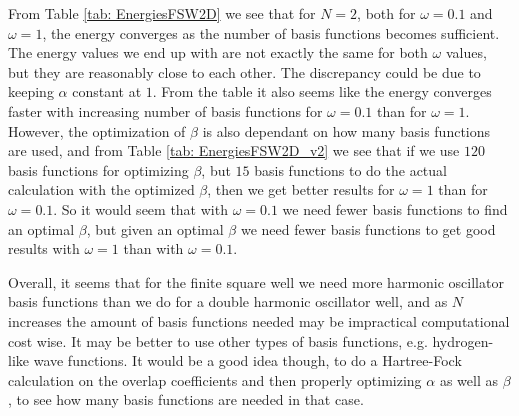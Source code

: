 \documentclass[../main.tex]{subfiles}
\begin{document}
From Table \ref{tab: EnergiesFSW2D} we see that for $N=2$, both for $\omega = 0.1$ and $\omega = 1$, the energy converges as the number of basis functions becomes sufficient. The energy values we end up with are not exactly the same for both $\omega$ values, but they are reasonably close to each other. The discrepancy could be due to keeping $\alpha$ constant at $1$. From the table it also seems like the energy converges faster with increasing number of basis functions for $\omega = 0.1$ than for $\omega = 1$. However, the optimization of $\beta$ is also dependant on how many basis functions are used, and from Table \ref{tab: EnergiesFSW2D_v2} we see that if we use $120$ basis functions for optimizing $\beta$, but $15$ basis functions to do the actual calculation with the optimized $\beta$, then we get better results for $\omega = 1$ than for $\omega = 0.1$. So it would seem that with $\omega = 0.1$ we need fewer basis functions to find an optimal $\beta$, but given an optimal $\beta$ we need fewer basis functions to get good results with $\omega = 1$ than with $\omega = 0.1$.

Overall, it seems that for the finite square well we need more harmonic oscillator basis functions than we do for a double harmonic oscillator well, and as $N$ increases the amount of basis functions needed may be impractical computational cost wise. It may be better to use other types of basis functions, e.g. hydrogen-like wave functions. It would be a good idea though, to do a Hartree-Fock calculation on the overlap coefficients and then properly optimizing $\alpha$ as well as $\beta$, to see how many basis functions are needed in that case.
\end{document}
